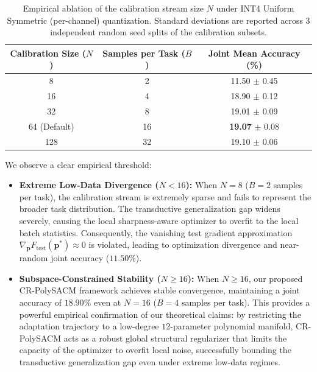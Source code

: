 \documentclass{article}
\theoremstyle{plain}
\theoremstyle{definition}
\theoremstyle{remark}
\begin{document}
\begin{table}[h]
\caption{Empirical ablation of the calibration stream size $N$ under INT4 Uniform Symmetric (per-channel) quantization. Standard deviations are reported across 3 independent random seed splits of the calibration subsets.}
\label{tab:calibration_ablation}
\begin{center}
\begin{small}
\begin{sc}
\begin{tabular}{ccc}
\toprule
Calibration Size ($N$) & Samples per Task ($B$) & Joint Mean Accuracy (\%) \\
\midrule
8 & 2 & 11.50 $\pm$ 0.45 \\
16 & 4 & 18.90 $\pm$ 0.12 \\
32 & 8 & 19.01 $\pm$ 0.09 \\
64 (Default) & 16 & \textbf{19.07} $\pm$ 0.08 \\
128 & 32 & 19.10 $\pm$ 0.06 \\
\bottomrule
\end{tabular}
\end{sc}
\end{small}
\end{center}
\end{table}

We observe a clear empirical threshold:
\begin{itemize}
    \item \textbf{Extreme Low-Data Divergence ($N < 16$):} When $N=8$ ($B=2$ samples per task), the calibration stream is extremely sparse and fails to represent the broader task distribution. The transductive generalization gap widens severely, causing the local sharpness-aware optimizer to overfit to the local batch statistics. Consequently, the vanishing test gradient approximation $\nabla_{\mathbf{p}} F_{\text{test}}(\mathbf{p}^*) \approx 0$ is violated, leading to optimization divergence and near-random joint accuracy ($11.50\%$).
    \item \textbf{Subspace-Constrained Stability ($N \ge 16$):} When $N \ge 16$, our proposed CR-PolySACM framework achieves stable convergence, maintaining a joint accuracy of $18.90\%$ even at $N=16$ ($B=4$ samples per task). This provides a powerful empirical confirmation of our theoretical claims: by restricting the adaptation trajectory to a low-degree $12$-parameter polynomial manifold, CR-PolySACM acts as a robust global structural regularizer that limits the capacity of the optimizer to overfit local noise, successfully bounding the transductive generalization gap even under extreme low-data regimes.
\end{itemize}
\end{document}
